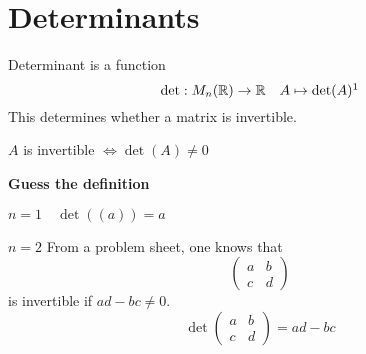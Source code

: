\documentclass[10pt, a4paper]{article}
\begin{document}
\newpage

\section{Determinants}
Determinant is a function
\[
\det : M_n(\R) \rightarrow \R\quad
A \mapsto \det(A)\footnotemark
\]
This determines whether a matrix is invertible.

$A$ is invertible $\iff \det(A) \neq 0$

\textbf{Guess the definition}

$n = 1\quad\det((a)) = a$

$n = 2$ From a problem sheet, one knows that
\[
\begin{pmatrix}
    a & b \\ c & d
\end{pmatrix}
\]
is invertible if $ad - bc \neq 0$.
\[
\det
\begin{pmatrix}
    a & b \\ c & d
\end{pmatrix} = ad - bc
\]
\end{document}
